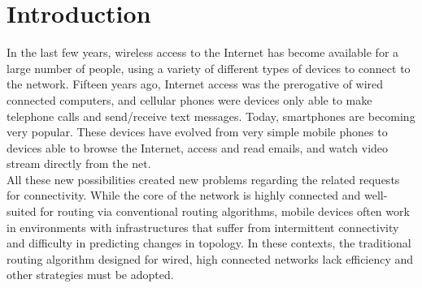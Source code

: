 
\chapter{Introduction}\label{introduzione} %







In the last few years, wireless access to the Internet has become available for a large number of people, using a variety of different types of devices to connect to the network. Fifteen years ago, Internet access was the prerogative of wired connected computers, and cellular phones were devices only able to make telephone calls and send/receive text messages. Today, smartphones are becoming very popular. These devices have evolved from very simple mobile phones to devices able to browse the Internet, access and read emails, and watch video stream directly from the net.
\\

All these new possibilities created new problems regarding the related requests for connectivity. While the core of the network is highly connected and well-suited for routing via conventional routing algorithms, mobile devices often work in environments with infrastructures that suffer from intermittent connectivity and difficulty in predicting changes in topology. In these contexts, the traditional routing algorithm designed for wired, high connected networks lack efficiency and other strategies must be adopted.
\\


